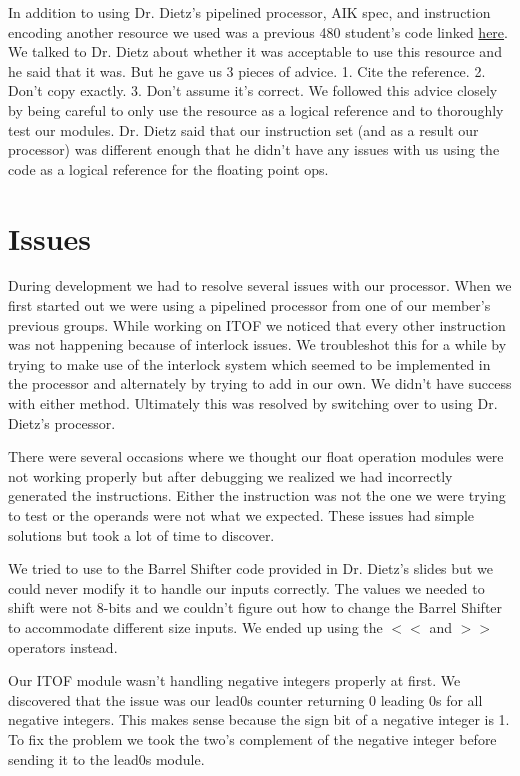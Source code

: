 \documentclass{article}
\begin{document}
\begin{multicols}{2}
In addition to using Dr. Dietz's pipelined processor, AIK spec, and instruction encoding another resource we used was a previous 480 student's code linked \href{https://github.com/darthburkhart/Project4/blob/master/floatpipe.v} {here}. We talked to Dr. Dietz about whether it was acceptable to use this resource and he said that it was. But he gave us 3 pieces of advice. 1. Cite the reference.  2. Don't copy exactly. 3. Don't assume it's correct. We followed this advice closely by being careful to only use the resource as a logical reference and to thoroughly test our modules. Dr. Dietz said that our instruction set (and as a result our processor) was different enough that he didn't have any issues with us using the code as a logical reference for the floating point ops.

  \section{Issues}
During development we had to resolve several issues with our processor. When we first started out we were using a pipelined processor from one of our member's previous groups. While working on ITOF we noticed that every other instruction was not happening because of interlock issues. We troubleshot this for a while by trying to make use of the interlock system which seemed to be implemented in the processor and alternately by trying to add in our own. We didn't have success with either method. Ultimately this was resolved by switching over to using Dr. Dietz's processor.

There were several occasions where we thought our float operation modules were not working properly but after debugging we realized we had incorrectly generated the instructions. Either the instruction was not the one we were trying to test or the operands were not what we expected.  These issues had simple solutions but took a lot of time to discover.

We tried to use to the Barrel Shifter code provided in Dr. Dietz's slides but we could never modify it to handle our inputs correctly. The values we needed to shift were not 8-bits and we couldn't figure out how to change the Barrel Shifter to accommodate different size inputs. We ended up using the $<<$ and $>>$ operators instead.

Our ITOF module wasn't handling negative integers properly at first. We discovered that the issue was our lead0s counter returning 0 leading 0s for all negative integers. This makes sense because the sign bit of a negative integer is 1. To fix the problem we took the two's complement of the negative integer before sending it to the lead0s module.


\end{multicols}
\end{document}
